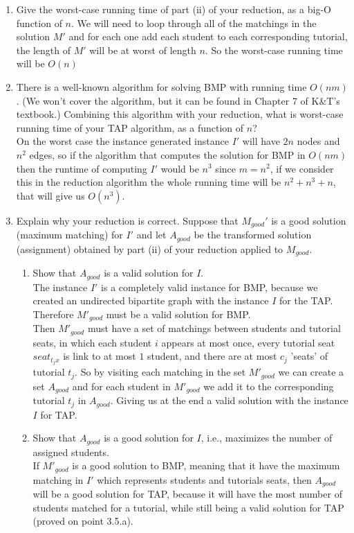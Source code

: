 \documentclass[11pt]{article}
\def\ans#1{{\color{ans}#1}}
\begin{document}
\begin{enumerate}
\item Give the worst-case running time of part (ii)
of your reduction, as a big-O function of $n$.
\ans{
  We will need to loop through all of the matchings in the solution $M'$ and 
  for each one add each student to each corresponding tutorial, the length of $M'$ will be at worst 
  of length $n$. So the worst-case running time will be $O(n)$
}

\item There is a well-known algorithm for solving BMP with running time
$O(nm)$. (We won't cover the algorithm, but it can be
found in Chapter 7 of K\&T's textbook.) Combining this algorithm
with your reduction, what is worst-case running time of
your TAP algorithm, as a function of $n$? \\
\ans{
  On the worst case the instance generated instance $I'$ will have $2n$ nodes and $n^2$ edges, so if 
  the algorithm that computes the solution for BMP in $O(nm)$ then the runtime of computing $I'$ would 
  be $n^3$ since $m = n^2$, if we consider this in the reduction algorithm the whole running time 
  will be $n^2 + n^3 + n$, that will give us $O(n^3)$.
}

\item Explain why your reduction is correct.  Suppose that $M_{good}'$ is
a good solution (maximum matching) for $I'$ and let
$A_{good}$ be the transformed solution (assignment) obtained by part (ii) of
your reduction applied to $M_{good}$.

\begin{enumerate}
\item Show that $A_{good}$ is a valid solution for $I$. \\
\ans{
  The instance $I'$ is a completely valid instance for BMP, because we created an undirected 
  bipartite graph with the instance $I$ for the TAP. Therefore $M'_{good}$ must be a valid solution 
  for BMP. \\
  Then $M'_{good}$ must have a set of matchings between students and tutorial seats, in which each 
  student $i$ appears at most once, every tutorial seat $seat_{t_jx}$ is link to at most $1$ student, 
  and there are at most $c_j$ 'seats' of tutorial $t_j$. So by visiting each matching in the set 
  $M'_{good}$ we can create a set $A_{good}$ and for each student in $M'_{good}$ we add it to 
  the corresponding tutorial $t_j$ in $A_{good}$. Giving us at the end a valid solution with the 
  instance $I$ for TAP.
}

\item Show that $A_{good}$ is a good solution for $I$, i.e., maximizes
the number of assigned students. \\
\ans{
  If $M'_{good}$ is a good solution to BMP, meaning that it have the maximum matching in $I'$ which 
  represents students and tutorials seats, then $A_{good}$ will be a good solution for TAP, 
  because it will have the most number of students matched for a tutorial, while still being a 
  valid solution for TAP (proved on point 3.5.a).
}
\end{enumerate}
\end{enumerate}
\end{document}
